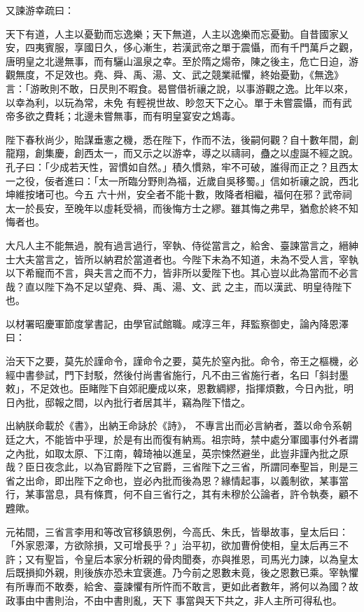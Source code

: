\begin{pinyinscope}
 又諫游幸疏曰：



 天下有道，人主以憂勤而忘逸樂；天下無道，人主以逸樂而忘憂勤。自昔國家乂安，四夷賓服，享國日久，侈心漸生，若漢武帝之單于震懾，而有千門萬戶之觀，唐明皇之北邊無事，而有驪山溫泉之幸。至於隋之煬帝，陳之後主，危亡日迫，游觀無度，不足效也。堯、舜、禹、湯、文、武之競業祗懼，終始憂勤，《無逸》言：「游畋則不敢，日昃則不暇食。曷嘗借祈禳之說，以事游觀之逸。比年以來，以幸為利，以玩為常，未免
 有輕視世故、眇忽天下之心。單于未嘗震懾，而有武帝多欲之費耗；北邊未嘗無事，而有明皇宴安之鴆毒。



 陛下春秋尚少，貽謀垂憲之機，悉在陛下，作而不法，後嗣何觀？自十數年間，創龍翔，創集慶，創西太一，而又示之以游幸，導之以禱祠，蠱之以虛誕不經之說。孔子曰：「少成若天性，習慣如自然。」積久慣熟，牢不可破，誰得而正之？且西太一之役，佞者進曰：「太一所臨分野則為福，近歲自吳移蜀。」信如祈禳之說，西北坤維按堵可也。今五
 六十州，安全者不能十數，敗降者相繼，福何在邪？武帝祠太一於長安，至晚年以虛耗受禍，而後悔方士之繆。雖其悔之弗早，猶愈於終不知悔者也。



 大凡人主不能無過，脫有過言過行，宰執、侍從當言之，給舍、臺諫當言之，縉紳士大夫當言之，皆所以納君於當道者也。今陛下未為不知道，未為不受人言，宰執以下希寵而不言，與夫言之而不力，皆非所以愛陛下也。其心豈以此為當而不必言哉？直以陛下為不足以望堯、舜、禹、湯、文、武
 之主，而以漢武、明皇待陛下也。



 以材署昭慶軍節度掌書記，由學官試館職。咸淳三年，拜監察御史，論內降恩澤曰：



 治天下之要，莫先於謹命令，謹命令之要，莫先於窒內批。命令，帝王之樞機，必經中書參試，門下封駁，然後付尚書省施行，凡不由三省施行者，名曰「斜封墨敕」，不足效也。臣睹陛下自郊祀慶成以來，恩數綢繆，指揮煩數，今日內批，明日內批，邸報之間，以內批行者居其半，竊為陛下惜之。



 出納朕命載於《書》，出納王命詠於《詩》，
 不專言出而必言納者，蓋以命令系朝廷之大，不能皆中乎理，於是有出而復有納焉。祖宗時，禁中處分軍國事付外者謂之內批，如取太原、下江南，韓琦袖以進呈，英宗悚然避坐，此豈非謹內批之原哉？臣日夜念此，以為官爵陛下之官爵，三省陛下之三省，所謂同奉聖旨，則是三省之出命，即出陛下之命也，豈必內批而後為恩？緣情起事，以義制欲，某事當行，某事當息，具有條貫，何不自三省行之，其有未穆於公論者，許令執奏，顧不
 韙歟。



 元祐間，三省言李用和等改官移鎮恩例，今高氏、朱氏，皆舉故事，皇太后曰：「外家恩澤，方欲除損，又可增長乎？」治平初，欲加曹佾使相，皇太后再三不許；又有聖旨，令皇后本家分析親的骨肉聞奏，亦與推恩，司馬光力諫，以為皇太后既損抑外親，則後族亦恐未宜褒進。乃今前之恩數未竟，後之恩數已乘。宰執懼有所專而不敢奏，給舍、臺諫懼有所忤而不敢言，更如此者數年，將何以為國？故政事由中書則治，不由中書則亂，天下
 事當與天下共之，非人主所可得私也。




\end{pinyinscope}
